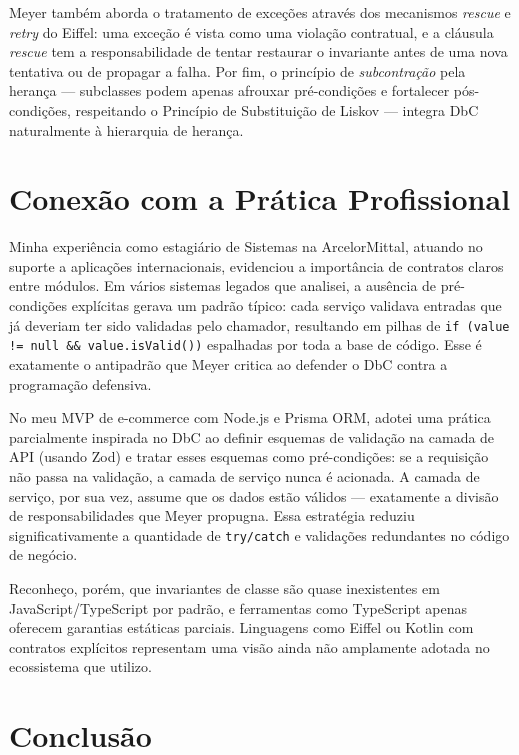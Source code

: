 \documentclass[12pt,a4paper]{article}
\begin{document}
Meyer tamb\'em aborda o tratamento de exce\c{c}\~oes atrav\'es dos mecanismos
\textit{rescue} e \textit{retry} do Eiffel: uma exce\c{c}\~ao \'e vista como
uma viola\c{c}\~ao contratual, e a cl\'ausula \textit{rescue} tem a responsabilidade
de tentar restaurar o invariante antes de uma nova tentativa ou de propagar a
falha. Por fim, o princ\'ipio de \textit{subcontra\c{c}\~ao} pela heran\c{c}a ---
subclasses podem apenas afrouxar pr\'e-condi\c{c}\~oes e fortalecer
p\'os-condi\c{c}\~oes, respeitando o Princ\'ipio de Substitui\c{c}\~ao de Liskov
--- integra DbC naturalmente \`a hierarquia de heran\c{c}a.

\section{Conex\~ao com a Pr\'atica Profissional}

Minha experi\^encia como estagi\'ario de Sistemas na ArcelorMittal, atuando no
suporte a aplica\c{c}\~oes internacionais, evidenciou a import\^ancia de contratos
claros entre m\'odulos. Em v\'arios sistemas legados que analisei, a aus\^encia de
pr\'e-condi\c{c}\~oes expl\'icitas gerava um padr\~ao t\'ipico: cada servi\c{c}o
validava entradas que j\'a deveriam ter sido validadas pelo chamador, resultando
em pilhas de \texttt{if (value != null \&\& value.isValid())} espalhadas por toda
a base de c\'odigo. Esse \'e exatamente o antipadr\~ao que Meyer critica ao
defender o DbC contra a programa\c{c}\~ao defensiva.

No meu MVP de e-commerce com Node.js e Prisma ORM, adotei uma pr\'atica
parcialmente inspirada no DbC ao definir esquemas de valida\c{c}\~ao na camada de
API (usando Zod) e tratar esses esquemas como pr\'e-condi\c{c}\~oes: se a requisi\c{c}\~ao
n\~ao passa na valida\c{c}\~ao, a camada de servi\c{c}o nunca \'e acionada. A
camada de servi\c{c}o, por sua vez, assume que os dados est\~ao v\'alidos ---
exatamente a divis\~ao de responsabilidades que Meyer propugna. Essa estrat\'egia
reduziu significativamente a quantidade de \texttt{try/catch} e valida\c{c}\~oes
redundantes no c\'odigo de neg\'ocio.

Reconhe\c{c}o, por\'em, que invariantes de classe s\~ao quase inexistentes em
JavaScript/TypeScript por padr\~ao, e ferramentas como TypeScript apenas oferecem
garantias est\'aticas parciais. Linguagens como Eiffel ou Kotlin com contratos
expl\'icitos representam uma vis\~ao ainda n\~ao amplamente adotada no ecossistema
que utilizo.

\section{Conclus\~ao}
\end{document}
